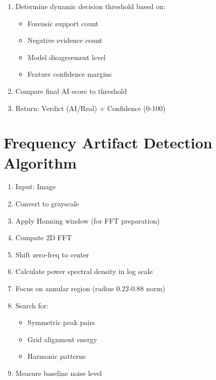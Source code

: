 \documentclass[12pt,a4paper]{book}
\begin{document}
\begin{itemize}
\begin{enumerate}
    \item Determine dynamic decision threshold based on:
    \begin{itemize}
        \item Forensic support count
        \item Negative evidence count
        \item Model disagreement level
        \item Feature confidence margins
    \end{itemize}
    
    \item Compare final AI score to threshold
    
    \item Return: Verdict (AI/Real) + Confidence (0-100)
\end{enumerate}

\section{Frequency Artifact Detection Algorithm}

\begin{enumerate}
    \item Input: Image
    
    \item Convert to grayscale
    
    \item Apply Hanning window (for FFT preparation)
    
    \item Compute 2D FFT
    
    \item Shift zero-freq to center
    
    \item Calculate power spectral density in log scale
    
    \item Focus on annular region (radius 0.22-0.88 norm)
    
    \item Search for:
    \begin{itemize}
        \item Symmetric peak pairs
        \item Grid alignment energy
        \item Harmonic patterns
    \end{itemize}
    
    \item Measure baseline noise level
    

\end{enumerate}
\end{itemize}
\end{document}
